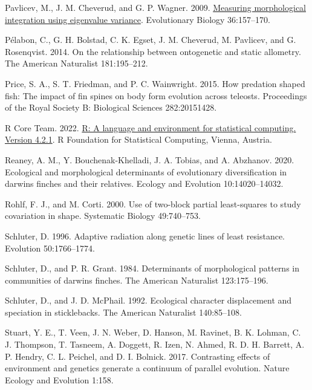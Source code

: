 \documentclass[
  11pt,
]{article}
\newlength{\cslhangindent}
\newlength{\cslentryspacingunit} %
\newenvironment{CSLReferences}[2] %
 {%
  \setlength{\parindent}{0pt}
  \ifodd #1
  \let\oldpar\par
  \def\par{\hangindent=\cslhangindent\oldpar}
  \fi
  \setlength{\parskip}{#2\cslentryspacingunit}
 }%
 {}
\begin{document}
\begin{CSLReferences}{1}{0}
\leavevmode{}%
Pavlicev, M., J. M. Cheverud, and G. P. Wagner. 2009.
\href{https://doi.org/10.1007/s11692-008-9042-7}{Measuring morphological
integration using eigenvalue variance}. Evolutionary Biology
36:157--170.

\leavevmode{}%
Pélabon, C., G. H. Bolstad, C. K. Egset, J. M. Cheverud, M. Pavlicev,
and G. Rosenqvist. 2014. On the relationship between ontogenetic and
static allometry. The American Naturalist 181:195--212.

\leavevmode{}%
Price, S. A., S. T. Friedman, and P. C. Wainwright. 2015. How predation
shaped fish: The impact of fin spines on body form evolution across
teleosts. Proceedings of the Royal Society B: Biological Sciences
282:20151428.

\leavevmode{}%
R Core Team. 2022. \href{https://www.R-project.org/}{R: A language and
environment for statistical computing. Version 4.2.1}. R Foundation for
Statistical Computing, Vienna, Austria.

\leavevmode{}%
Reaney, A. M., Y. Bouchenak-Khelladi, J. A. Tobias, and A. Abzhanov.
2020. Ecological and morphological determinants of evolutionary
diversification in darwin{\textquotesingle}s finches and their
relatives. Ecology and Evolution 10:14020--14032.

\leavevmode{}%
Rohlf, F. J., and M. Corti. 2000. Use of two-block partial least-squares
to study covariation in shape. Systematic Biology 49:740--753.

\leavevmode{}%
Schluter, D. 1996. Adaptive radiation along genetic lines of least
resistance. Evolution 50:1766--1774.

\leavevmode{}%
Schluter, D., and P. R. Grant. 1984. Determinants of morphological
patterns in communities of darwin{\textquotesingle}s finches. The
American Naturalist 123:175--196.

\leavevmode{}%
Schluter, D., and J. D. McPhail. 1992. Ecological character displacement
and speciation in sticklebacks. The American Naturalist 140:85--108.

\leavevmode{}%
Stuart, Y. E., T. Veen, J. N. Weber, D. Hanson, M. Ravinet, B. K.
Lohman, C. J. Thompson, T. Tasneem, A. Doggett, R. Izen, N. Ahmed, R. D.
H. Barrett, A. P. Hendry, C. L. Peichel, and D. I. Bolnick. 2017.
Contrasting effects of environment and genetics generate a continuum of
parallel evolution. Nature Ecology and Evolution 1:158.


\end{CSLReferences}
\end{document}
